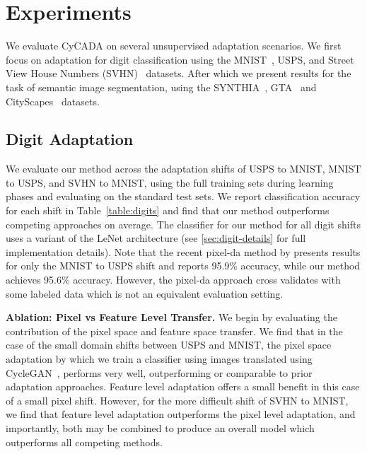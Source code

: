 \section{Experiments}
\label{sec:experiments}

We evaluate CyCADA on several unsupervised adaptation scenarios. We first focus on adaptation for digit classification using the MNIST~\citep{lecun_ieee98}, USPS, and Street View House Numbers (SVHN)~\citep{netzer_nips11} datasets. After which we present results for the task of semantic image segmentation, using the SYNTHIA~\citep{ros_cvpr16}, GTA~\citep{richter_eccv16} and CityScapes~\citep{cordts_cvpr16} datasets. 

\subsection{Digit Adaptation}
We evaluate our method across the adaptation shifts of USPS to MNIST, MNIST to USPS, and SVHN to MNIST, using the full training sets during learning phases and evaluating on the standard test sets. We report classification accuracy for each shift in Table~\ref{table:digits} and find that our method outperforms competing approaches on average. 
The classifier for our method for all digit shifts uses a variant of the LeNet architecture (see \ref{sec:digit-details} for full implementation details). 
Note that the recent pixel-da method by \citet{bousmalis_cvpr17} presents results for only the MNIST to USPS shift and reports 95.9\% accuracy, while our method achieves 95.6\% accuracy. However, the pixel-da approach cross validates with some labeled data which is not an equivalent evaluation setting. 

\textbf{Ablation: Pixel vs Feature Level Transfer.} We begin by evaluating the contribution of the pixel space and feature space transfer. 
We find that in the case of the small domain shifts between USPS and MNIST, the pixel space adaptation by which we train a classifier using images translated using CycleGAN~\citep{zhu_arxiv17}, performs very well, outperforming or comparable to prior adaptation approaches. 
Feature level adaptation offers a small benefit in this case of a small pixel shift. 
However, for the more difficult shift of SVHN to MNIST, we find that feature level adaptation outperforms the pixel level adaptation, and importantly, both may be combined to produce an overall model which outperforms all competing methods. 


